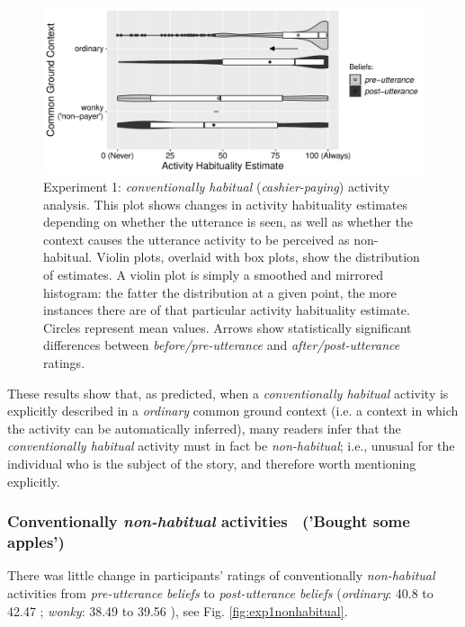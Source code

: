 \documentclass{sp}\usepackage[]{graphicx}\usepackage[]{color}
\makeatletter
\def\maxwidth{ %
  \ifdim\Gin@nat@width>\linewidth
    \linewidth
  \else
    \Gin@nat@width
  \fi
}
\newenvironment{knitrout}{}{} %
\makeatother
\begin{document}
\begin{knitrout}
\color{fgcolor}\begin{figure}
\includegraphics[width=\maxwidth]{figure/unnamed-chunk-15-1} \caption{\label{fig:exp1habitual}Experiment 1: \textit{conventionally habitual} (\textit{cashier-paying}) activity analysis. This plot shows changes in activity habituality estimates depending on whether the utterance is seen, as well as whether the context causes the utterance activity to be perceived as non-habitual. Violin plots, overlaid with box plots, show the distribution of estimates.  A violin plot is simply a smoothed and mirrored histogram: the fatter the distribution at a given point, the more instances there are of that particular activity habituality estimate.  Circles represent mean values. Arrows show statistically significant differences between \textit{before/pre-utterance} and \textit{after/post-utterance} ratings.}\label{fig:unnamed-chunk-15}
\end{figure}


\end{knitrout}

These results show that, as predicted, when a \textit{conventionally habitual} activity is explicitly described in a \textit{ordinary} common ground context (i.e. a context in which the activity can be automatically inferred), many readers infer that the \textit{conventionally habitual} activity must in fact be \textit{non-habitual}; i.e., unusual for the individual who is the subject of the story, and therefore worth mentioning explicitly.

\subsubsection{Conventionally \textit{non-habitual} activities$\quad$('Bought some apples')}

There was little change in participants' ratings of conventionally \textit{non-habitual} activities from \textit{pre-utterance beliefs} to \textit{post-utterance beliefs} (\textit{ordinary}: %
40.8
 to %
42.47
; \textit{wonky}: %
38.49
 to %
39.56
), see Fig. \ref{fig:exp1nonhabitual}.
\end{document}
